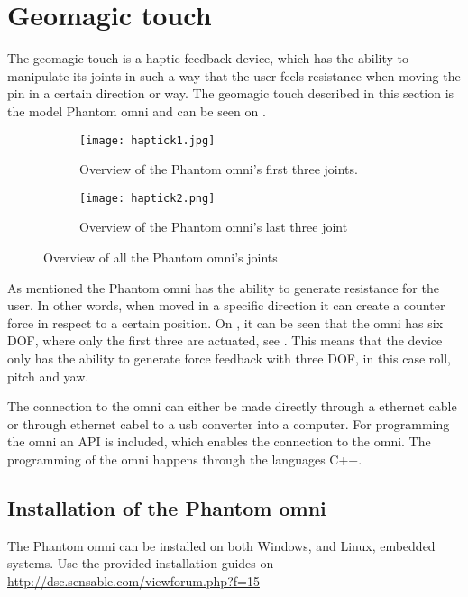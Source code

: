 \section{Geomagic touch}\label{sec:geo_magic}
The geomagic touch is a haptic feedback device, which has the ability to manipulate its joints in such a way that the user feels resistance when moving the pin in a certain direction or way. The geomagic touch described in this section is the model Phantom omni and can be seen on .

\begin{figure}[H]
	\centering
	\begin{subfigure}{.45\textwidth}
		\centering
		\texttt{[image: haptick1.jpg]}
		\caption{Overview of the Phantom omni's first three joints.}
		\label{fig:phantom1}
	\end{subfigure}
	\begin{subfigure}{.45\textwidth}
		\centering
		\texttt{[image: haptick2.png]}
		\caption{Overview of the Phantom omni's last three joint}
		\label{fig:phantom2}
	\end{subfigure}
\caption{Overview of all the Phantom omni's joints\citep{phantom_omni}}
\label{fig:phantom_omni}
\end{figure}

As mentioned the Phantom omni has the ability to generate resistance for the user. In other words, when moved in a specific direction it can create a counter force in respect to a certain position. On , it can be seen that the omni has six \gls{DOF}, where only the first three are actuated, see . This means that the device only has the ability to generate force feedback with three \gls{DOF}, in this case roll, pitch and yaw.

The connection to the omni can either be made directly through a ethernet cable or through ethernet cabel to a usb converter into a computer. For programming the omni an API is included, which enables the connection to the omni. The programming of the omni happens through the languages C++. 

\subsection*{Installation of the Phantom omni}

The Phantom omni can be installed on both Windows, and Linux, embedded systems. 
Use the provided installation guides on\\
\url{http://dsc.sensable.com/viewforum.php?f=15}

